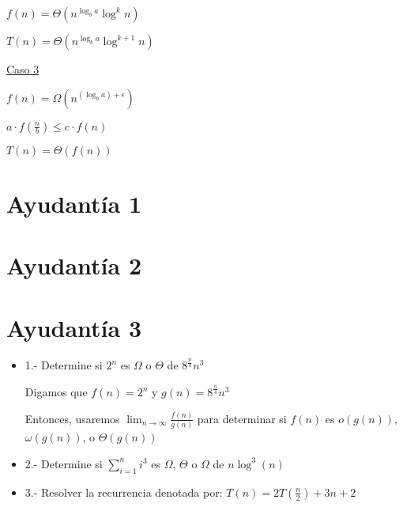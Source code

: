 \documentclass[12pt]{article}
\begin{document}
\begin{itemize}
\begin{center}
    $f(n) = \varTheta (n^{\log _b a} \log ^k n)$
    
    $T(n) = \varTheta (n^{\log _b a} \log ^{k+1} n)$
    
  \end{center}
  \newpage
  \begin{center}
    \underline{Caso 3}
    
    $f(n) = \varOmega  (n^{(\log _b a) + \epsilon})$
    
    $a \cdot f(\frac{n}{b}) \leqslant  c \cdot f(n)$
    
    $T(n) = \varTheta (f(n))$

  \end{center}
  
\end{itemize}
\newpage

\section{Ayudantía 1}
\section{Ayudantía 2}
\section{Ayudantía 3}

\begin{itemize}
  \item 1.- Determine si $2^{n}$ es $\Omega$ o $\Theta$ de $8^{\frac{n}{4}}n^3$
  \vspace{1em}
  
  \begin{center}
    Digamos que $f(n) = 2^n$ y $g(n) = 8^{\frac{n}{4}}n^3$
    \vspace{0.5em}
    
    Entonces, usaremos $\lim_{n\to\infty}\frac{f(n)}{g(n)}$ para determinar si $f(n)$ es $o(g(n))$, $\omega(g(n))$, o $\varTheta(g(n))$
    \vspace{1em}
  \end{center}
  
  \item 2.- Determine si $\sum_{i = 1}^{n}i^3$ es $\Omega$, $\Theta$ o $\Omega$ de $n\log^3(n)$
  \vspace{1em}
  \item 3.- Resolver la recurrencia denotada por: $T(n) = 2T(\frac{n}{2})+3n+2$
\end{itemize}
\end{document}
